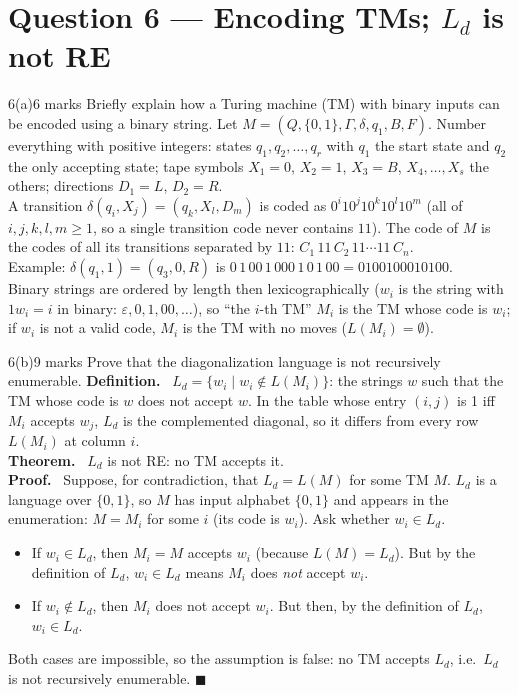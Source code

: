 \documentclass[10.5pt,a4paper]{article}
\newcommand{\ansh}[1]{\textbf{\color{exborder}#1}\ }
\newcommand{\eps}{\varepsilon}
\newcommand{\Ld}{L_d}
\begin{document}
\section{Question 6 --- Encoding TMs; $L_d$ is not RE}
\begin{qa}{6(a)}{6 marks}
Briefly explain how a Turing machine (TM) with binary inputs can be encoded using a binary string.
\tcblower
Let $M=(Q,\{0,1\},\Gamma,\delta,q_1,B,F)$. Number everything with positive integers: states $q_1,q_2,\dots,q_r$ with $q_1$ the start state and $q_2$
the only accepting state; tape symbols $X_1=0$, $X_2=1$, $X_3=B$, $X_4,\dots,X_s$ the others; directions $D_1=L$, $D_2=R$.\\
A transition $\delta(q_i,X_j)=(q_k,X_l,D_m)$ is coded as $0^i10^j10^k10^l10^m$ (all of $i,j,k,l,m\ge1$, so a single transition code never
contains $11$). The code of $M$ is the codes of all its transitions separated by $11$: $C_1\,11\,C_2\,11\cdots11\,C_n$.\\
Example: $\delta(q_1,1)=(q_3,0,R)$ is $0\,1\,00\,1\,000\,1\,0\,1\,00=0100100010100$.\\
Binary strings are ordered by length then lexicographically ($w_i$ is the string with $1w_i=i$ in binary: $\eps,0,1,00,\dots$), so ``the $i$-th TM''
$M_i$ is the TM whose code is $w_i$; if $w_i$ is not a valid code, $M_i$ is the TM with no moves ($L(M_i)=\emptyset$).
\end{qa}

\begin{qa}{6(b)}{9 marks}
Prove that the diagonalization language is not recursively enumerable.
\tcblower
\ansh{Definition.} $\Ld=\{w_i\mid w_i\notin L(M_i)\}$: the strings $w$ such that the TM whose code is $w$ does not accept $w$. In the table whose
entry $(i,j)$ is 1 iff $M_i$ accepts $w_j$, $\Ld$ is the complemented diagonal, so it differs from every row $L(M_i)$ at column $i$.\\
\ansh{Theorem.} $\Ld$ is not RE: no TM accepts it.\\
\ansh{Proof.} Suppose, for contradiction, that $\Ld=L(M)$ for some TM $M$. $\Ld$ is a language over $\{0,1\}$, so $M$ has input alphabet $\{0,1\}$
and appears in the enumeration: $M=M_i$ for some $i$ (its code is $w_i$). Ask whether $w_i\in\Ld$.
\begin{itemize}
\item If $w_i\in\Ld$, then $M_i=M$ accepts $w_i$ (because $L(M)=\Ld$). But by the definition of $\Ld$, $w_i\in\Ld$ means $M_i$ does \emph{not} accept $w_i$.
\item If $w_i\notin\Ld$, then $M_i$ does not accept $w_i$. But then, by the definition of $\Ld$, $w_i\in\Ld$.
\end{itemize}
Both cases are impossible, so the assumption is false: no TM accepts $\Ld$, i.e.\ $\Ld$ is not recursively enumerable. $\blacksquare$
\end{qa}
\end{document}
